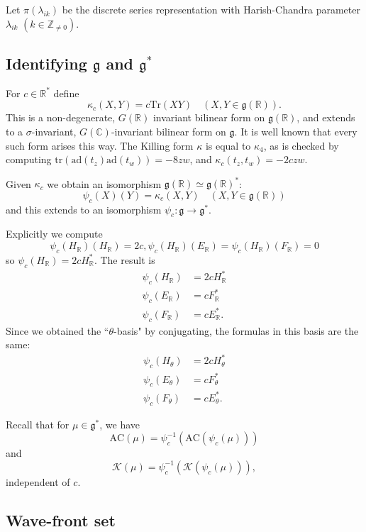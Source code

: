 \documentclass[10pt,leqno]{article}
\numberwithin{equation}{section}
\newcommand{\ad}{\mathrm{ad}}
\newcommand{\R}{\mathbb R}
\newcommand{\C}{\mathbb C}
\newcommand{\Z}{\mathbb Z}
\newcommand{\K}{\mathcal K}
\newcommand{\g}{\mathfrak g}
\newcommand{\AC}{\mathrm{AC}}
\begin{document}
Let $\pi(\lambda_{ik})$ be the discrete series representation with Harish-Chandra parameter $\lambda_{ik}$ $(k\in \Z_{\ne 0})$.

\subsection{Identifying  $\g$ and $\g^*$}


For $c\in \R^*$ define
$$
\kappa_c(X,Y)=c\mathrm{Tr}(XY)\quad (X,Y\in \g(\R)).
$$
This is a non-degenerate, $G(\R)$ invariant bilinear form on $\g(\R)$, and extends to a $\sigma$-invariant, $G(\C)$-invariant bilinear form on $\g$. 
It is well known that every such form arises this way.
The Killing form $\kappa$ is equal to $\kappa_4$, 
as is checked by computing  $\mathrm{tr}(\ad(t_z)\ad(t_w))=-8zw$, and 
 $\kappa_c(t_z,t_w)=-2czw$.

Given $\kappa_c$ we obtain an isomorphism $\g(\R)\simeq \g(\R)^*$:
$$
\psi_c(X)(Y)=\kappa_c(X,Y)\quad (X,Y\in \g(\R))
$$
and this extends to an isomorphism $\psi_c: \g\rightarrow \g^*$. 

Explicitly we compute
$$
\psi_c(H_\R)(H_\R)=2c, \psi_c(H_\R)(E_\R)= \psi_c(H_\R)(F_\R)=0
$$
so  $\psi_c(H_\R)=2cH_\R^*$.
The result is
\begin{equation}
\label{e:psic1}
\begin{aligned}
\psi_c(H_\R)&=2cH_\R^*\\
\psi_c(E_\R)&=cF_\R^*\\
\psi_c(F_\R)&=cE_\R^*.
\end{aligned}
\end{equation}
Since we obtained the ``$\theta$-basis" by conjugating, the formulas in this basis are the same:
\begin{equation}
\label{e:psic2}
\begin{aligned}
\psi_c(H_\theta)&=2cH_\theta^*\\
\psi_c(E_\theta)&=cF_\theta^*\\
\psi_c(F_\theta)&=cE_\theta^*.
\end{aligned}
\end{equation}

Recall that for $\mu\in \g^*$, we have
$$
\AC(\mu)=\psi_c^{-1}(\AC(\psi_c(\mu)))
$$
and
$$
\K(\mu)=\psi_c^{-1}(\K(\psi_c(\mu))),
$$
independent of $c$.







\subsection{Wave-front set}
\end{document}
